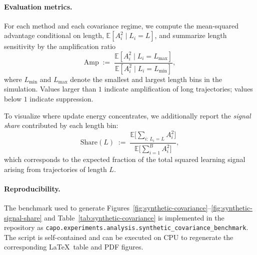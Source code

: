 \paragraph{Evaluation metrics.}
For each method and each covariance regime, we compute the mean-squared advantage conditional on length,
\(\mathbb E[A_i^2\mid L_i=L]\), and summarize length sensitivity by the amplification ratio
\begin{equation}
  \mathrm{Amp}
  \;:=\;
  \frac{\mathbb E[A_i^2\mid L_i=L_{\max}]}{\mathbb E[A_i^2\mid L_i=L_{\min}]},
  \label{eq:synth_amp_def}
\end{equation}
where \(L_{\min}\) and \(L_{\max}\) denote the smallest and largest length bins in the simulation.
Values larger than \(1\) indicate amplification of long trajectories; values below \(1\) indicate suppression.

To visualize where update energy concentrates, we additionally report the \emph{signal share} contributed by each length bin:
\begin{equation}
  \mathrm{Share}(L)
  \;:=\;
  \frac{\mathbb E\big[\sum_{i:\,L_i=L} A_i^2\big]}{\mathbb E\big[\sum_{i=1}^{B} A_i^2\big]},
  \label{eq:synth_share_def}
\end{equation}
which corresponds to the expected fraction of the total squared learning signal arising from trajectories of length \(L\).

\paragraph{Reproducibility.}
The benchmark used to generate Figures~\ref{fig:synthetic-covariance}--\ref{fig:synthetic-signal-share} and Table~\ref{tab:synthetic-covariance} is implemented in the repository as \texttt{capo.experiments.analysis.synthetic\_covariance\_benchmark}.
The script is self-contained and can be executed on CPU to regenerate the corresponding \LaTeX\ table and PDF figures.
